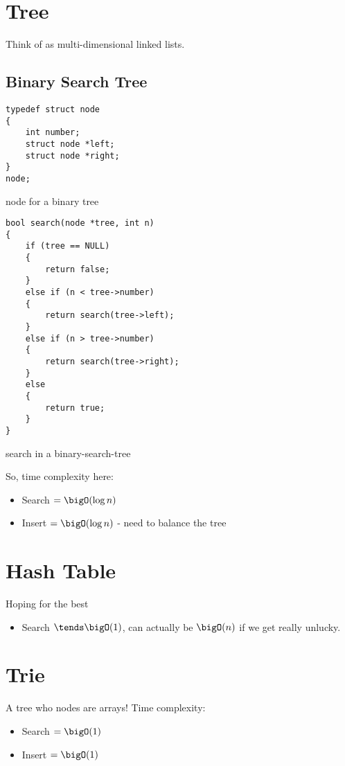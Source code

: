 \section{Tree}
Think of as multi-dimensional linked lists.
\subsection{Binary Search Tree}
\begin{code}
	\begin{verbatim}
typedef struct node
{
	int number;
	struct node *left;
	struct node *right;
}
node;
	\end{verbatim}
	\caption{node for a binary tree}
\end{code}
\clearpage
\begin{code}
	\begin{verbatim}
bool search(node *tree, int n)
{
	if (tree == NULL)
	{
		return false;
	}
	else if (n < tree->number)
	{
		return search(tree->left);
	}
	else if (n > tree->number)
	{
		return search(tree->right);
	}
	else 
	{
		return true;
	}
}
	\end{verbatim}
	\caption{search in a binary-search-tree}
\end{code}

So, time complexity here:
\begin{itemize}
	\item Search $= \bigO(\log n)$
	\item Insert $= \bigO(\log n)$ - need to balance the tree
\end{itemize}

\section{Hash Table}
Hoping for the best
\begin{itemize}
	\item Search $\tends \bigO(1)$, can actually be $\bigO(n)$
	      if we get really unlucky.
\end{itemize}

\section{Trie}
A tree who nodes are arrays! Time complexity:
\begin{itemize}
	\item Search $= \bigO(1)$
	\item Insert $= \bigO(1)$
\end{itemize}

